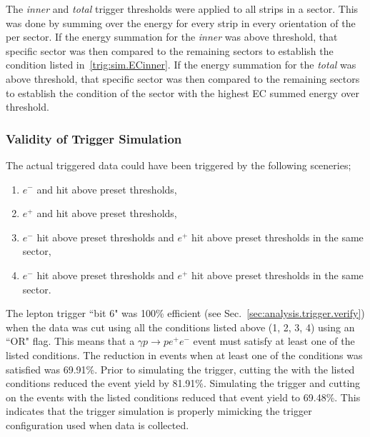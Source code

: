 The  \emph{inner} and  \emph{total} trigger thresholds were applied to all  strips in a sector. This was done by summing over the energy for every strip in every orientation of the  per sector. If the energy summation for the  \emph{inner} was above threshold,   that specific sector was then compared to the remaining sectors to establish the condition listed in~\ref{trig:sim.ECinner}. If the energy summation for the  \emph{total} was above threshold, that specific sector was then compared to the remaining sectors to establish the condition of the sector with the highest EC summed energy over threshold.

\subsubsection{Validity of Trigger Simulation}
The actual triggered data could have been triggered by the following sceneries;
\begin{enumerate}\label{trig:get.all}
\item $e^-$  and  hit above preset thresholds,
\item $e^+$  and  hit above preset thresholds,
\item $e^-$  hit above preset thresholds and $e^+$  hit above preset thresholds in the same sector, 
\item $e^-$  hit above preset thresholds and $e^+$  hit above preset thresholds in the same sector. 
\end{enumerate}
The lepton trigger ``bit 6" was 100\% efficient (see Sec.~\ref{sec:analysis.trigger.verify}) when the data was cut using all the conditions listed above (1, 2, 3, 4) using an ``OR" flag. This means that a $\gamma p \to p e^+ e^-$ event must satisfy at least one of the listed conditions. The reduction in events when at least one of the conditions was satisfied was 69.91\%. Prior to simulating the trigger, cutting the  with the listed conditions reduced the event yield by 81.91\%. Simulating the trigger and cutting on the  events with the listed conditions reduced that event yield to 69.48\%. This indicates that the trigger simulation is properly mimicking the trigger configuration used when data is collected. 

%
%




